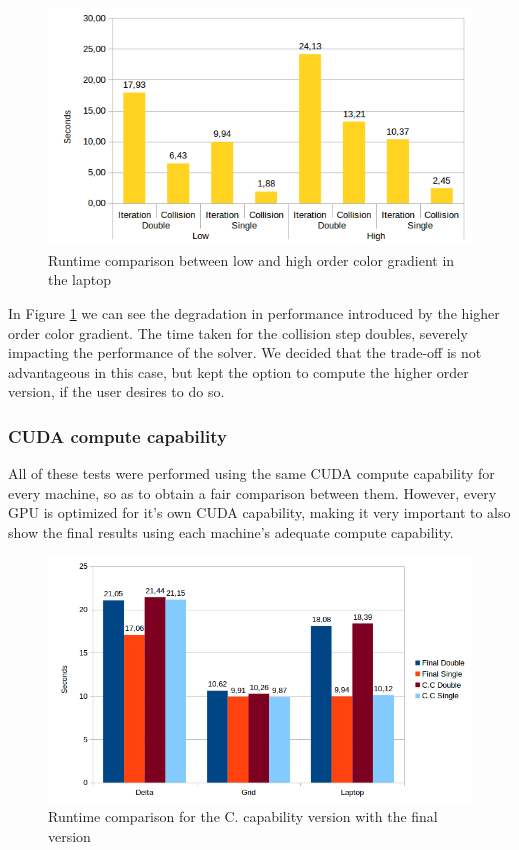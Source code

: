 \documentclass[12pt]{book}
\begin{document}
  \begin{figure}[H]
  	\centering
  	\includegraphics[width=\linewidth]{Resources/Images/highlap.png}
  	\caption{Runtime comparison between low and high order color gradient in the laptop}
  	\label{fig:highLap}
  \end{figure}
  
  In Figure \ref{fig:highLap} we can see the degradation in performance introduced by the higher order color gradient. The time taken for the collision step doubles, severely impacting the performance of the solver. We decided that the trade-off is not advantageous in this case, but kept the option to compute the higher order version, if the user desires to do so. 

\subsubsection{CUDA compute capability}

All of these tests were performed using the same CUDA compute capability for every machine, so as to obtain a fair comparison between them. However, every GPU is optimized for it's own CUDA capability, making it very important to also show the final results using each machine's adequate compute capability.

  \begin{figure}[H]
  	\centering
  	\includegraphics[width=\linewidth]{Resources/Images/cc.png}
  	\caption{Runtime comparison for the C. capability version with the final version}
  	\label{fig:cc}
  \end{figure}
  
\end{document}
